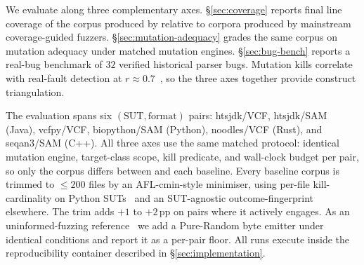 
We evaluate \biotest{} along three complementary axes.
\S\ref{sec:coverage} reports final line coverage of the corpus
produced by \biotest{} relative to corpora produced by mainstream
coverage-guided fuzzers. \S\ref{sec:mutation-adequacy} grades the
same corpus on mutation adequacy under matched mutation engines.
\S\ref{sec:bug-bench} reports a real-bug benchmark of $32$
verified historical parser bugs. Mutation kills correlate with
real-fault detection at
$r{\approx}0.7$~\citep{just2014mutants}, so the three axes
together provide construct triangulation.

The evaluation spans six $(\mathrm{SUT, format})$ pairs:
htsjdk/VCF, htsjdk/SAM (Java), vcfpy/VCF, biopython/SAM (Python),
noodles/VCF (Rust), and seqan3/SAM (C++). All three axes use the
same matched protocol: identical mutation engine, target-class
scope, kill predicate, and wall-clock budget per pair, so only
the corpus differs between \biotest{} and each baseline. Every
baseline corpus is trimmed to $\le 200$ files by an
AFL-cmin-style minimiser, using per-file kill-cardinality on
Python SUTs~\citep{vikram2023guiding} and an SUT-agnostic
outcome-fingerprint elsewhere. The trim adds $+1$ to $+2$\,pp on
pairs where it actively engages. As an uninformed-fuzzing
reference~\citep{klees2018fuzz} we add a Pure-Random byte emitter
under identical conditions and report it as a per-pair floor.
All runs execute inside the reproducibility container described
in \S\ref{sec:implementation}.
